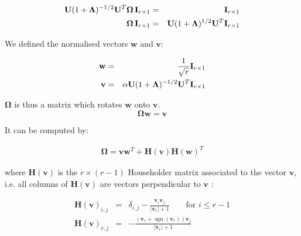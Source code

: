 \documentclass[a4paper,12pt]{article}
\newcommand{\sgn}{\mathop{\mathrm{sgn}}}
\begin{document}
\begin{eqnarray}
  \mathbf U (1+ \mathbf \Lambda)^{-1/2} \mathbf U^T \mathbf \Omega \, \mathbf I_{r \times 1} &=& \mathbf I_{r \times 1} \\
  \mathbf \Omega \, \mathbf I_{r \times 1} &=& \mathbf U (1+ \mathbf \Lambda)^{1/2} \mathbf U^T \mathbf I_{r \times 1}
\end{eqnarray}

We defined the normalised vectors $\mathbf w$ and $\mathbf v$:

\begin{eqnarray}
  \mathbf w &=& \frac{1}{\sqrt{r}} \mathbf I_{r \times 1} \\
  \mathbf v &=& \alpha \mathbf U (1+ \mathbf \Lambda)^{-1/2} \mathbf U^T \mathbf I_{r \times 1}
\end{eqnarray}

$\mathbf \Omega$ is thus a matrix which rotates $\mathbf w$ onto $\mathbf v$. 
\begin{equation}
\mathbf \Omega \mathbf w = \mathbf v
\end{equation}

It can be computed by:

\begin{eqnarray}
\mathbf \Omega = \mathbf v \mathbf w^T  + \mathbf H({\mathbf v}) \mathbf H({\mathbf w})^T
\end{eqnarray}

where $\mathbf H(\mathbf v)$ is the $r \times (r-1)$ Householder matrix associated to the vector $\mathbf v$, i.e.
all columns of $\mathbf H({\mathbf v})$ are vectors perpendicular to $\mathbf v$ \citep{Hoteit02}:

\begin{eqnarray}
\mathbf H(\mathbf v)_{i,j} &=& \delta_{i,j} - \frac{\mathbf v_i \mathbf v_j}{|\mathbf v_r| + 1}   \qquad \mbox{for $i \le r-1$} \\
\mathbf H(\mathbf v)_{r,j} &=& - \frac{(\mathbf v_r + \sgn(\mathbf v_r)) \mathbf v_j }{|\mathbf v_r| + 1}
\end{eqnarray}




\end{document}

